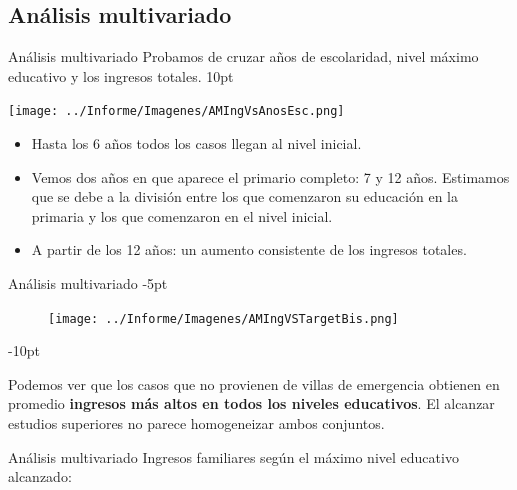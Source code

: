 \documentclass[pdf]{beamer}
\def\vspace{}%
\begin{document}
{    \subsection{Análisis multivariado}
\begin{frame}{Análisis multivariado}
    \footnotesize
    Probamos de cruzar años de escolaridad, nivel máximo educativo y los ingresos totales.
    \vspace{10pt}
    \begin{minipage}{0.5\textwidth}
        \texttt{[image: ../Informe/Imagenes/AMIngVsAnosEsc.png]}
    \end{minipage}
\begin{minipage}{0.45\textwidth}
    \begin{itemize}
        \footnotesize
        \justifying%
        \item Hasta los 6 años todos los casos llegan al nivel inicial.
        \item Vemos dos años en que aparece el primario completo: 7 y 12 años. Estimamos que se debe a la división entre los que comenzaron su educación en la primaria y los que comenzaron en el nivel inicial.
        \item A partir de los 12 años: un aumento consistente de los ingresos totales.
    \end{itemize}
\end{minipage}
\end{frame} 
\begin{frame}{Análisis multivariado}
    \vspace{-5pt}
    \begin{figure}[H]
        \texttt{[image: ../Informe/Imagenes/AMIngVSTargetBis.png]}
    \end{figure}
    \vspace{-10pt}
    
    
    Podemos ver que los casos que no provienen de villas de emergencia obtienen en promedio \textbf{ingresos más altos en todos los niveles educativos}. El alcanzar estudios superiores no parece homogeneizar ambos conjuntos. 
\end{frame}


\begin{frame}{Análisis multivariado}
    Ingresos familiares según el máximo nivel educativo alcanzado:


\end{frame}}
\end{document}
